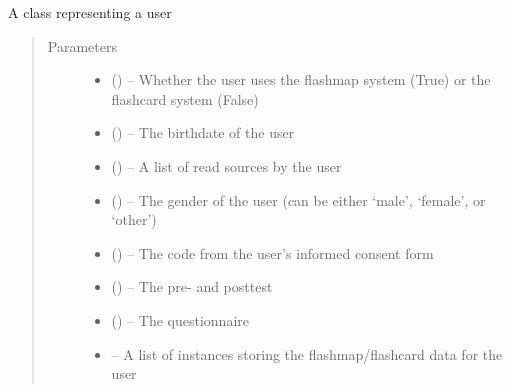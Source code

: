 \documentclass[letterpaper,10pt,english]{sphinxmanual}
\begin{document}
\begin{fulllineitems}
\label{\detokenize{user:user.User}}
A class representing a user
\begin{quote}\begin{description}
\item[{Parameters}] \leavevmode\begin{itemize}
\item {} 
 () -- Whether the user uses the flashmap system (True) or the flashcard system (False)

\item {} 
 () -- The birthdate of the user

\item {} 
 (\sphinxstyleliteralemphasis{(}\sphinxstyleliteralemphasis{)}\sphinxstyleliteralemphasis{}) -- A list of read sources by the user

\item {} 
 () -- The gender of the user (can be either `male', `female', or `other')

\item {} 
 () -- The code from the user's informed consent form

\item {} 
 (\sphinxstyleliteralemphasis{)}\sphinxstyleliteralemphasis{}) -- The pre- and posttest

\item {} 
 ({\hyperref[\detokenize{questionnaire:questionnaire.Questionnaire}]{}}) -- The questionnaire

\item {} 
 -- A list of instances storing the flashmap/flashcard data for the user


\end{itemize}
\end{description}
\end{quote}
\end{fulllineitems}
\end{document}
